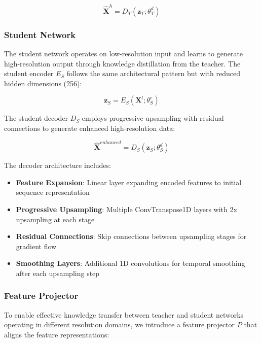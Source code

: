 \begin{equation}
\hat{\mathbf{X}}^h = D_T(\mathbf{z}_T; \theta_T^d)
\end{equation}

\subsubsection{Student Network}

\hspace{2em}The student network operates on low-resolution input and learns to generate high-resolution output through knowledge distillation from the teacher. The student encoder $E_S$ follows the same architectural pattern but with reduced hidden dimensions (256):

\begin{equation}
\mathbf{z}_S = E_S(\mathbf{X}^l; \theta_S^e)
\end{equation}

The student decoder $D_S$ employs progressive upsampling with residual connections to generate enhanced high-resolution data:

\begin{equation}
\hat{\mathbf{X}}^{enhanced} = D_S(\mathbf{z}_S; \theta_S^d)
\end{equation}

The decoder architecture includes:

\begin{itemize}
    \item \textbf{Feature Expansion}: Linear layer expanding encoded features to initial sequence representation
    \item \textbf{Progressive Upsampling}: Multiple ConvTranspose1D layers with 2x upsampling at each stage
    \item \textbf{Residual Connections}: Skip connections between upsampling stages for gradient flow
    \item \textbf{Smoothing Layers}: Additional 1D convolutions for temporal smoothing after each upsampling step
\end{itemize}

\subsubsection{Feature Projector}

\hspace{2em}To enable effective knowledge transfer between teacher and student networks operating in different resolution domains, we introduce a feature projector $P$ that aligns the feature representations:

